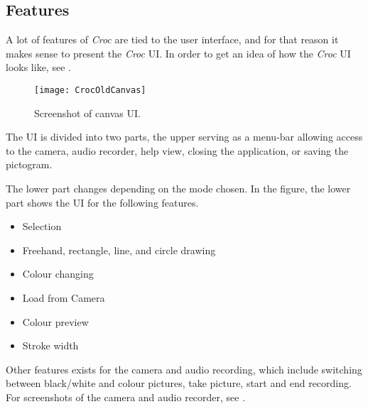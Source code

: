 \subsection{Features}
A lot of features of \textit{Croc} are tied to the user interface, and for that reason it makes sense to present the \textit{Croc} UI.
In order to get an idea of how the \textit{Croc} UI looks like, see . 

\begin{figure}[h]
     \centering
     \texttt{[image: CrocOldCanvas]}
     \caption{Screenshot of canvas UI.}
     \label{fig:croc-old-canvas}
\end{figure}

The UI is divided into two parts, the upper serving as a menu-bar allowing access to the camera, audio recorder, help view, closing the application, or saving the pictogram.

The lower part changes depending on the mode chosen.
In the figure, the lower part shows the UI for the following features.

\begin{itemize}
     \item Selection
     \item Freehand, rectangle, line, and circle drawing
     \item Colour changing
     \item Load from Camera
     \item Colour preview
     \item Stroke width
\end{itemize}

Other features exists for the camera and audio recording, which include switching between black/white and colour pictures, take picture, start and end recording.
For screenshots of the camera and audio recorder, see .